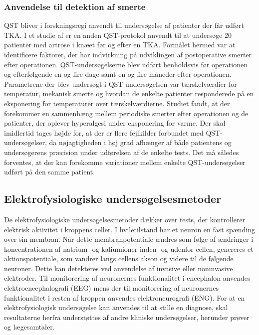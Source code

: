 \subsubsection{Anvendelse til detektion af smerte}
QST bliver i forskningsregi anvendt til undersøgelse af patienter der får udført TKA. I et studie af \citep{Martinez2007} er en anden QST-protokol anvendt til at undersøge 20 patienter med artrose i knæet før og efter en TKA. Formålet hermed var at identificere faktorer, der har indvirkning på udviklingen af postoperative smerter efter operationen. QST-undersøgelserne blev udført henholdsvis før operationen og efterfølgende en og fire dage samt en og fire måneder efter operationen. Parametrene der blev undersøgt i QST-undersøgelsen var tærskelværdier for temperatur, mekanisk smerte og hvordan de enkelte patienter responderede på en eksponering for temperaturer over tærskelværdierne. Studiet fandt, at der forekommer en sammenhæng mellem periodiske smerter efter operationen og de patienter, der oplever hyperalgesi under eksponering for varme. \citep{Martinez2007} Der skal imidlertid tages højde for, at der er flere fejlkilder forbundet med QST-undersøgelser, da nøjagtigheden i høj grad afhænger af både patientens og undersøgerens præcision under udførelsen af de enkelte tests. Det må således forventes, at der kan forekomme variationer mellem enkelte QST-undersøgelser udført på den samme patient. \citep{Yarnitsky2006}

\subsection{Elektrofysiologiske undersøgelsesmetoder}
De elektrofysiologiske undersøgelsesmetoder dækker over tests, der kontrollerer elektrisk aktivitet i kroppens celler. I hviletilstand har et neuron en fast spænding over sin membran. Når dette membranpotentiale ændres som følge af ændringer i koncentrationen af natrium- og kaliumioner inden- og udenfor cellen, genereres et aktionspotentiale, som vandrer langs cellens akson og videre til de følgende neuroner. Dette kan detekteres ved anvendelse af invasive eller noninvasive elektroder. Til monitorering af neuronernes funktionalitet i encephalon anvendes elektroencephalografi (EEG) mens der til monitorering af neuronernes funktionalitet i resten af kroppen anvendes elektroneurografi (ENG). For at en elektrofysiologisk undersøgelse kan anvendes til at stille en diagnose, skal resultaterne herfra understøttes af andre kliniske undersøgelser, herunder prøver og lægesamtaler. \citep{Robinson2008}

